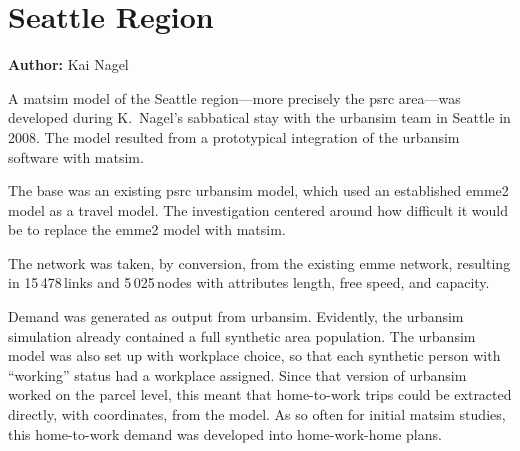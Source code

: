 \section{Seattle Region}
\label{sec:seattle}
\hfill \textbf{Author:} Kai Nagel


A \gls{matsim} model of the Seattle region---more precisely the \gls{psrc} area---was developed during K.\ Nagel's sabbatical stay with the \gls{urbansim} team in Seattle in 2008. The model resulted from a prototypical integration of the \gls{urbansim} software \citep[e.g.,][]{WaddellEtc2003UrbanSim} with \gls{matsim}. 

The base was an existing \gls{psrc} \gls{urbansim} model, which used an established \gls{emme2} model 
as a travel model. The investigation centered around how difficult it would be to replace the \gls{emme2} model with \gls{matsim}. 

The network was taken, by conversion, from the existing \gls{emme} network, resulting in 15\,478\,links and 5\,025\,nodes with attributes length, free speed, and capacity.

Demand was generated as output from \gls{urbansim}. Evidently, the \gls{urbansim} simulation already contained a full synthetic area population. The \gls{urbansim} model was also set up with workplace choice, so that each synthetic person with ``working'' status had a workplace assigned. Since that version of \gls{urbansim} worked on the parcel level, this meant that home-to-work trips could be extracted directly, with coordinates, from the model. As so often for initial \gls{matsim}  studies, this home-to-work demand was developed into home-work-home plans.

